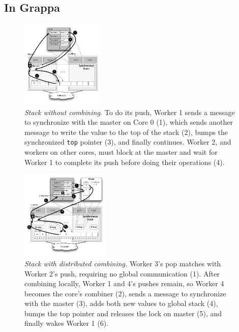 \subsection{In Grappa}

\begin{figure}[t]
    \centering
    \includegraphics[width=0.35\textwidth]{figs/stack_nofc.pdf}
    \caption{\emph{Stack without combining.}
      To do its push, Worker 1 sends a message to synchronize with the master on Core 0 (1), which sends another message to write the value to the top of the stack (2), bumps the synchronized \texttt{top} pointer (3), and finally continues. Worker 2, and workers on other cores, must block at the master and wait for Worker 1 to complete its push before doing their operations (4).
    }
    \label{fig:stacknofc}
\end{figure}
\begin{figure}
    \centering
    \includegraphics[width=0.38\textwidth]{figs/stack_fc.pdf}
    \caption{\emph{Stack with distributed combining.}
      Worker 3's pop matches with Worker 2's push, requiring no global communication (1). After combining locally, Worker 1 and 4's pushes remain, so Worker 4 becomes the core's combiner (2), sends a message to synchronize with the master (3), adds both new values to global stack (4), bumps the top pointer and releases the lock on master (5), and finally wakes Worker 1 (6).
    }
    \label{fig:stackfc}
\end{figure}

